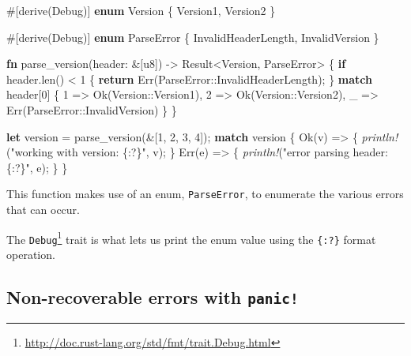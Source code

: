 \documentclass[a4paper,]{book}
\newenvironment{Shaded}{\begin{snugshade}}{\end{snugshade}}
\newcommand{\KeywordTok}[1]{\textcolor[rgb]{0.13,0.29,0.53}{\textbf{{#1}}}}
\newcommand{\DataTypeTok}[1]{\textcolor[rgb]{0.13,0.29,0.53}{{#1}}}
\newcommand{\DecValTok}[1]{\textcolor[rgb]{0.00,0.00,0.81}{{#1}}}
\newcommand{\ConstantTok}[1]{\textcolor[rgb]{0.00,0.00,0.00}{{#1}}}
\newcommand{\StringTok}[1]{\textcolor[rgb]{0.31,0.60,0.02}{{#1}}}
\newcommand{\BuiltInTok}[1]{{#1}}
\newcommand{\PreprocessorTok}[1]{\textcolor[rgb]{0.56,0.35,0.01}{\textit{{#1}}}}
\newcommand{\AttributeTok}[1]{\textcolor[rgb]{0.77,0.63,0.00}{{#1}}}
\newcommand{\NormalTok}[1]{{#1}}
\renewcommand{\href}[2]{#2\footnote{\url{#1}}}
\begin{document}
\begin{Shaded}
\begin{Highlighting}[]
\AttributeTok{#[}\NormalTok{derive}\AttributeTok{(}\BuiltInTok{Debug}\AttributeTok{)]}
\KeywordTok{enum} \NormalTok{Version \{ Version1, Version2 \}}

\AttributeTok{#[}\NormalTok{derive}\AttributeTok{(}\BuiltInTok{Debug}\AttributeTok{)]}
\KeywordTok{enum} \NormalTok{ParseError \{ InvalidHeaderLength, InvalidVersion \}}

\KeywordTok{fn} \NormalTok{parse_version(header: &[}\DataTypeTok{u8}\NormalTok{]) -> }\DataTypeTok{Result}\NormalTok{<Version, ParseError> \{}
    \KeywordTok{if} \NormalTok{header.len() < }\DecValTok{1} \NormalTok{\{}
        \KeywordTok{return} \ConstantTok{Err}\NormalTok{(ParseError::InvalidHeaderLength);}
    \NormalTok{\}}
    \KeywordTok{match} \NormalTok{header[}\DecValTok{0}\NormalTok{] \{}
        \DecValTok{1} \NormalTok{=> }\ConstantTok{Ok}\NormalTok{(Version::Version1),}
        \DecValTok{2} \NormalTok{=> }\ConstantTok{Ok}\NormalTok{(Version::Version2),}
        \NormalTok{_ => }\ConstantTok{Err}\NormalTok{(ParseError::InvalidVersion)}
    \NormalTok{\}}
\NormalTok{\}}

\KeywordTok{let} \NormalTok{version = parse_version(&[}\DecValTok{1}\NormalTok{, }\DecValTok{2}\NormalTok{, }\DecValTok{3}\NormalTok{, }\DecValTok{4}\NormalTok{]);}
\KeywordTok{match} \NormalTok{version \{}
    \ConstantTok{Ok}\NormalTok{(v) => \{}
        \PreprocessorTok{println!}\NormalTok{(}\StringTok{"working with version: \{:?\}"}\NormalTok{, v);}
    \NormalTok{\}}
    \ConstantTok{Err}\NormalTok{(e) => \{}
        \PreprocessorTok{println!}\NormalTok{(}\StringTok{"error parsing header: \{:?\}"}\NormalTok{, e);}
    \NormalTok{\}}
\NormalTok{\}}
\end{Highlighting}
\end{Shaded}

This function makes use of an enum, \texttt{ParseError}, to enumerate
the various errors that can occur.

The
\href{http://doc.rust-lang.org/std/fmt/trait.Debug.html}{\texttt{Debug}}
trait is what lets us print the enum value using the \texttt{\{:?\}}
format operation.

\subsection{\texorpdfstring{Non-recoverable errors with
\texttt{panic!}}{Non-recoverable errors with panic!}}\label{non-recoverable-errors-with-panic}
\end{document}
